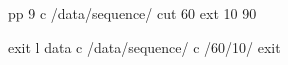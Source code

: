pp                                                                              
9                                                                               
c /data/sequence/                                                               
cut 60                                                                          
ext 10 90                                                                       
                                                                                
                                                                                
                                                                                
                                                                                
                                                                                
                                                                                
                                                                                
                                                                                
                                                                                
                                                                                
                                                                                
                                                                                
                                                                                
                                                                                
                                                                                
                                                                                
                                                                                
                                                                                
                                                                                
                                                                                
                                                                                
                                                                                
                                                                                
                                                                                
exit                                                                            
l data                                                                          
c /data/sequence/                                                               
c /60/10/                                                                       
exit                                                                            
